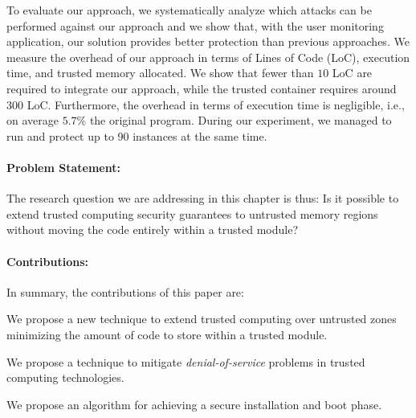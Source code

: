 To evaluate our approach, we systematically analyze which attacks can be 
performed against our approach and we show that, with the user monitoring 
application, our solution provides better protection than previous approaches. 
We measure the overhead of our approach in terms of Lines of Code (LoC), 
execution time, and trusted memory allocated. We 
show that fewer than $10$ LoC are required to 
integrate our approach, while the trusted container requires around $300$ LoC.
Furthermore, the overhead in terms of execution time is 
negligible, i.e., on average $5.7\%$ \wrt the original program.
During our experiment, we managed to run and protect up to 90 instances at the 
same time.

\vspace{-0.25cm}
\paragraph{Problem Statement:}
The research question we are addressing in this chapter is thus: Is it possible 
to extend trusted computing security guarantees to untrusted memory regions 
without moving the code entirely within a trusted module?

\vspace{-0.25cm}
\paragraph{Contributions:}
In summary, the contributions of this paper are:

\begin{enumerate*}[label=(\textbf{\alph*})]
	\item We propose a new technique to extend trusted computing over untrusted 
	zones minimizing the amount of code to store within a trusted module.
	\item We propose a technique to mitigate \emph{denial-of-service} problems 
	in trusted computing technologies.
	\item We propose an algorithm for achieving a secure installation and boot 
	phase.
\end{enumerate*}

